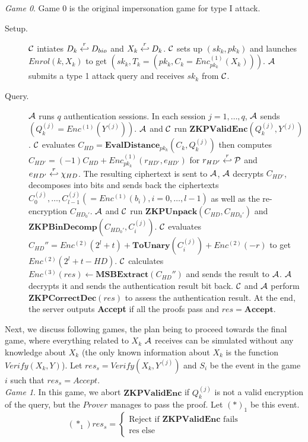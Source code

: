\textit{Game 0}. Game 0 is the original impersonation game for type I attack.
\begin{description}
\item [Setup.] $\mathcal{C}$ intiates $D_k \stackrel{r}{\hookleftarrow} D_{bio}$ and $X_k \stackrel{r}{\hookleftarrow} D_k$. $\mathcal{C}$ sets up
  $(sk_k, pk_k)$ and launches $Enrol(k, X_k)$ to get $(sk_k, T_k =(pk_k, C_k = Enc^{(1)}_{pk_k}(X_k)))$.  $\mathcal{A}$
  submits a type 1 attack query and receives $sk_k$ from $\mathcal{C}$.
\item [Query.] $\mathcal{A}$ runs $q$ authentication sessions. In each session $j = 1, \dots, q$, $\mathcal{A}$ sends
  $(Q_k^{(j)} = Enc^{(1)}(Y^{(j)}))$. $\mathcal{A}$ and $\mathcal{C}$ run
  $\mathbf{ZKPValidEnc}(Q_k^{(j)},Y^{(j)})$. $\mathcal{C}$ evaluates
  $C_{HD} = \mathbf{EvalDistance}_{pk_k}(C_k, Q_k^{(j)})$ then computes
  $C_{HD'} = (-1)C_{HD} + Enc_{pk_k}^{(1)}(r_{HD'},e_{HD'})$ for $r_{HD'} \stackrel{r}{\hookleftarrow} \mathcal{P}$ and
  $e_{HD'} \stackrel{r}{\hookleftarrow} \chi_{HD}$. The resulting ciphertext is sent to $\mathcal{A}$, $\mathcal{A}$ decrypts $C_{HD'}$, 
  decomposes into bits and sends back the ciphertexts
  $C_0^{(j)}, \dots, C_{l-1}^{(j)} (= Enc^{(1)}(b_i), i = 0,\dots, l-1)$ as well as the re-encryption
  $C_{HD_0'}$. $\mathcal{A}$ and $\mathcal{C}$ run $\mathbf{ZKPUnpack}(C_{HD},C_{HD_0'})$ and
  $\mathbf{ZKPBinDecomp}(C_{HD_0'}, C_i^{(j)})$.  $\mathcal{C}$ evaluates
  $C_{HD}'' = Enc^{(2)}(2^l + t) + \mathbf{ToUnary}(C_i^{(j)}) + Enc^{(2)}(-r) $ to get $Enc^{(2)}(2^l + t -
  HD)$. $\mathcal{C}$ calculates $Enc^{(3)}(res) \gets \mathbf{MSBExtract}(C_{HD}'')$ and sends the result to $\mathcal{A}$. $\mathcal{A}$
  decrypts it and sends the authentication result bit back. $\mathcal{C}$ and $\mathcal{A}$ perform
  $\mathbf{ZKPCorrectDec}(res)$ to assess the authentication result. At the end, the server outputs \textbf{Accept} if
  all the proofs pass and $res = \mathbf{Accept}$.
\end{description}
Next, we discuss following games, the plan being to proceed towards the final game, where everything related to $X_k$
$\mathcal{A}$ receives can be simulated without any knowledge about $X_k$ (the only known information about $X_k$ is
the function $Verify(X_k, Y)$). Let $res_s = Verify(X_k, Y^{(j)})$ and $S_i$ be
the event in the game $i$ such that $res_s = Accept$.\\
\textit{Game 1}. In this game, we abort $\mathbf{ZKPValidEnc}$ if $Q_k^{(j)}$ is not a valid encryption of the query,
but the $Prover$ manages to pass the proof. Let $(*)_1$ be this event.
\[
  (*_1)res_s = \begin{cases}
    \text{Reject if } \mathbf{ZKPValidEnc} \text{ fails}\\
    \text{res else}
  \end{cases}
\]
